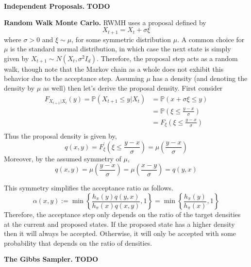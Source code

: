\documentclass[12pt]{article}
\newcommand{\Prob}{\mathbb{P}}
\begin{document}
\bigskip

\textbf{Independent Proposals.} \textbf{TODO} 

\bigskip

\textbf{Random Walk Monte Carlo.} RWMH uses a proposal defined by
\[X_{t + 1} = X_t + \sigma \xi \]
where $\sigma > 0$ and $\xi \sim \mu$, for some symmetric distribution $\mu$. A common choice for $\mu$ is the standard normal distribution, in which case the next 
state is simply given by $X_{t + 1} \sim N(X_t, \sigma^2 I_d)$. Therefore, the proposal step acts as a random walk, though note that the Markov chain as a whole does not 
exhibit this behavior due to the acceptance step. Assuming $\mu$ has a density (and denoting the density by $\mu$ as well) then let's derive the proposal density. 
First consider
\begin{align*}
F_{X_{t + 1}|X_t}(y) = \Prob(X_{t + 1} \leq y|X_t) &= \Prob(x + \sigma \xi \leq y) \\
									 &= \Prob\left(\xi \leq \frac{y - x}{\sigma}\right) \\
									 &= F_{\xi}\left(\xi \leq \frac{y - x}{\sigma}\right) \\
\end{align*}
Thus the proposal density is given by, 
\[q(x, y) = F_{\xi}^\prime \left(\xi \leq \frac{y - x}{\sigma}\right) = \mu\left(\frac{y - x}{\sigma}\right)\]
Moreover, by the assumed symmetry of $\mu$, 
\[q(x, y) = \mu\left(\frac{y - x}{\sigma}\right) = \mu\left(\frac{x - y}{\sigma}\right) = q(y, x)\]

This symmetry simplifies the acceptance ratio as follows.  
\[\alpha(x, y) := \min\left\{\frac{h_\pi(y) q(y, x)}{h_\pi(x)q(x, y)}, 1\right\} = \min\left\{\frac{h_\pi(y)}{h_\pi(x)}, 1\right\} \]
Therefore, the acceptance step only depends on the ratio of the target densities at the current and proposed states. If the proposed state has a higher density then it will 
always be accepted. Otherwise, it will only be accepted with some probability that depends on the ratio of densities. 

\bigskip

\textbf{The Gibbs Sampler.} \textbf{TODO} 

\bigskip
\end{document}
